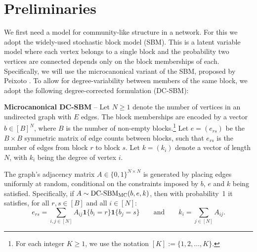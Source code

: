 \section{Preliminaries}

We first need a model for community-like structure in a network. For this we adopt the widely-used stochastic block model (SBM). This is a latent variable model where each vertex belongs to a single block and the probability two vertices are connected depends only on the block memberships of each.
Specifically, we will use the microcanonical variant of the SBM, proposed by Peixoto \cite{Peixoto-Bayesian-Microcanonical}. To allow for degree-variability between members of the same block, we adopt the following degree-corrected 
formulation (DC-SBM):

\textbf{Microcanonical DC-SBM} --
Let $N \geq 1$ denote the number of vertices in an undirected graph
with $E$ edges. The block memberships are encoded by a vector $b \in [B]^N$,
where $B$ is the number of non-empty blocks.\footnote{For each integer $K\geq 1$, we use the notation $[K]:=\{1,2,\ldots,K\}$.}
	Let $e=(e_{rs})$ be the $B \times B$ symmetric matrix of edge counts 
between blocks, such that $e_{rs}$ is the number of edges from block $r$ to 
block $s$. 
	Let $k =(k_i)$ denote a vector of length $N$, with $k_i$ being the degree of vertex $i$.

The graph's adjacency matrix $A \in \{0,1\}^{N \times N}$ is generated 
by placing edges uniformly at random, conditional
on the constraints imposed by $b$, $e$ and $k$ being satisfied.
Specifically, if $A \sim \mbox{\rm DC-SBM}_{\rm MC} (b, e, k)$,
then with probability~1 it satisfies,
for all $r,s\in[B]$
and all $i\in[N]$:
%
\begin{equation}
	e_{rs} = \sum_{i, j \in [N]} A_{ij} 
\boldsymbol{1} \{b_i = r\} \boldsymbol{1} \{b_j = s\} 
	\qquad 
	\textrm{and} \qquad
	k_i = \sum_{j \in [N]} A_{ij}.
	\label{eqn:sbm-constraints}
\end{equation}
